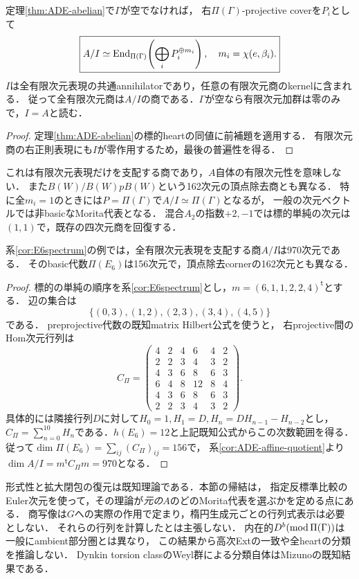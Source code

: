 \begin{corollary}[反標準アフィン代数の全有限次元表現]\label{cor:ADE-affine-quotient}
定理\ref{thm:ADE-abelian}で$\Gamma$が空でなければ，
右$\Pi(\Gamma)$-projective coverを$P_i$として
\[
 \boxed{A/I\simeq
 \operatorname{End}_{\Pi(\Gamma)}\!\left(\bigoplus_iP_i^{\oplus m_i}\right),
 \quad m_i=\chi(e,\beta_i).}
\]
$I$は全有限次元表現の共通annihilatorであり，任意の有限次元商のkernelに含まれる．
従って全有限次元商は$A/I$の商である．$\Gamma$が空なら有限次元加群は零のみで，$I=A$と読む．
\end{corollary}
\begin{proof}
定理\ref{thm:ADE-abelian}の標的heartの同値に前補題を適用する．
有限次元商の右正則表現にも$I$が零作用するため，最後の普遍性を得る．
\end{proof}
これは有限次元表現だけを支配する商であり，$A$自体の有限次元性を意味しない．
また$B(W)/B(W)pB(W)$という162次元の頂点除去商とも異なる．
特に全$m_i=1$のときには$P=\Pi(\Gamma)$で$A/I\simeq\Pi(\Gamma)$となるが，
一般の次元ベクトルでは非basicなMorita代表となる．
混合$A_2$の指数$+2,-1$では標的単純の次元は$(1,1)$で，既存の四次元商を回復する．

\begin{corollary}\label{cor:E6-970}
系\ref{cor:E6spectrum}の例では，全有限次元表現を支配する商$A/I$は970次元である．
そのbasic代数$\Pi(E_6)$は156次元で，頂点除去cornerの162次元とも異なる．
\end{corollary}
\begin{proof}
標的の単純の順序を系\ref{cor:E6spectrum}とし，$m=(6,1,1,2,2,4)^{\mathsf t}$とする．
辺の集合は
\[
 \{(0,3),(1,2),(2,3),(3,4),(4,5)\}
\]
である．
preprojective代数の既知matrix Hilbert公式\cite[\S1, (1)]{EtingofRains}を使うと，
右projective間のHom次元行列は
\[
 C_\Pi=\begin{pmatrix}
 4&2&4&6&4&2\\
 2&2&3&4&3&2\\
 4&3&6&8&6&3\\
 6&4&8&12&8&4\\
 4&3&6&8&6&3\\
 2&2&3&4&3&2
 \end{pmatrix}.
\]
具体的には隣接行列$D$に対して$H_0=1,H_1=D,H_n=DH_{n-1}-H_{n-2}$とし，
$C_\Pi=\sum_{n=0}^{10}H_n$である．$h(E_6)=12$と上記既知公式からこの次数範囲を得る．
従って$\dim\Pi(E_6)=\sum_{ij}(C_\Pi)_{ij}=156$で，
系\ref{cor:ADE-affine-quotient}より$\dim A/I=m^{\mathsf t}C_\Pi m=970$となる．
\end{proof}

\begin{remark}[既知入力と具体性の範囲]
形式性と拡大閉包の復元は既知理論である．本節の帰結は，
指定反標準比較のEuler次元を使って，その理論が\emph{元の}$A$のどのMorita代表を選ぶかを定める点にある．
商写像は$G$への実際の作用で定まり，楕円生成元ごとの行列式表示は必要としない．
それらの行列を計算したとは主張しない．
内在的$D^b(\operatorname{mod}\Pi(\Gamma))$は一般にambient部分圏とは異なり，
この結果から高次Extの一致や全heartの分類を推論しない．
Dynkin torsion classのWeyl群による分類自体はMizuno\cite{Mizuno}の既知結果である．
\end{remark}
